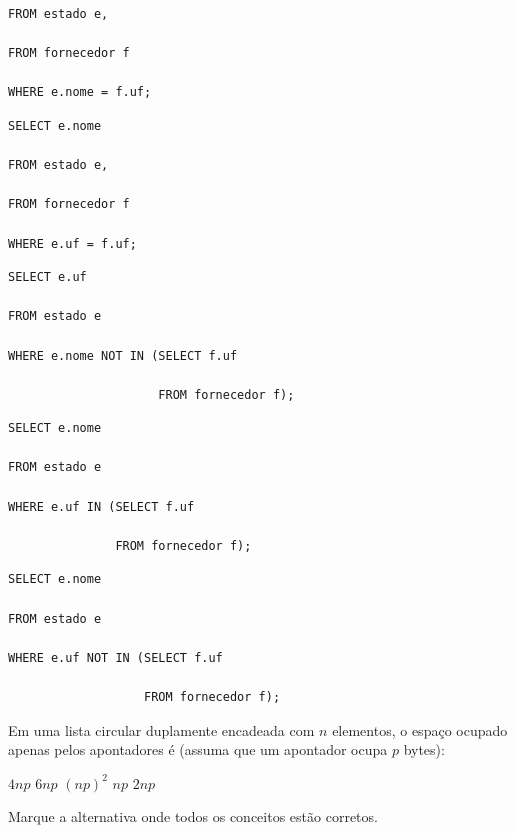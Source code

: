 \documentclass[12pt, addpoints]{exam}
\begin{document}
\begin{questions}
\begin{choices}
\begin{verbatim}
FROM estado e,

FROM fornecedor f

WHERE e.nome = f.uf;

\end{verbatim}


\choice \begin{verbatim}SELECT e.nome

FROM estado e,

FROM fornecedor f

WHERE e.uf = f.uf;

\end{verbatim}


\choice \begin{verbatim}SELECT e.uf

FROM estado e

WHERE e.nome NOT IN (SELECT f.uf

                     FROM fornecedor f);

\end{verbatim}
\choice \begin{verbatim}SELECT e.nome

FROM estado e

WHERE e.uf IN (SELECT f.uf

               FROM fornecedor f);

\end{verbatim}


\choice \begin{verbatim}SELECT e.nome

FROM estado e

WHERE e.uf NOT IN (SELECT f.uf

                   FROM fornecedor f);

\end{verbatim}


\end{choices}

\question

Em uma lista circular duplamente encadeada com \( n \) elementos, o espaço ocupado apenas pelos apontadores é (assuma que um apontador ocupa \( p \) bytes):
\begin{choices}
\choice \( 4np \)
\choice \( 6np \)
\choice \( (np)^2 \)
\choice \( np \)
\choice \( 2np \)
\end{choices}

\question

Marque a alternativa onde todos os conceitos estão corretos.



\end{questions}
\end{document}
